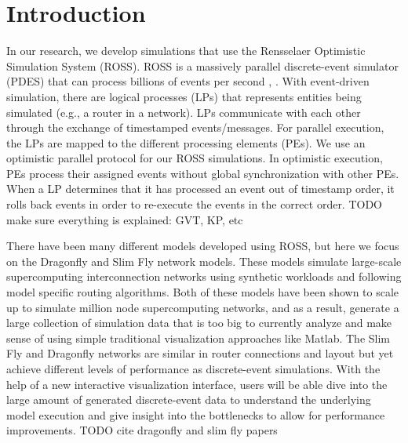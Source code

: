 \documentclass{acm_proc_article-sp}
\begin{document}
\maketitle
%
%

%
%


%
%

%
%






\section{Introduction}
In our research, we develop simulations that use the Rensselaer Optimistic Simulation System (ROSS).  ROSS is a massively parallel discrete-event simulator (PDES) that can process billions of events per second \cite{Holder}, \cite{Bauer}.  With event-driven simulation, there are logical processes (LPs) that represents entities being simulated (e.g., a router in a network). LPs communicate with each other through the exchange of timestamped events/messages.  For parallel execution, the LPs are mapped to the different processing elements (PEs). We use an optimistic parallel protocol for our ROSS simulations.  In optimistic execution, PEs process their assigned events without global synchronization with other PEs.  When a LP determines that it has processed an event out of timestamp order, it rolls back events in order to re-execute the events in the correct order.
\color{red} TODO make sure everything is explained: GVT, KP, etc \color{black}

There have been many different models developed using ROSS, but here we focus on the Dragonfly and Slim Fly network models. These models simulate large-scale supercomputing interconnection networks using synthetic workloads and following model specific routing algorithms. Both of these models have been shown to scale up to simulate million node supercomputing networks, and as a result, generate a large collection of simulation data that is too big to currently analyze and make sense of using simple traditional visualization approaches like Matlab. The Slim Fly and Dragonfly networks are similar in router connections and layout but yet achieve different levels of performance as discrete-event simulations. With the help of a new interactive visualization interface, users will be able dive into the large amount of generated discrete-event data to understand the underlying model execution and give insight into the bottlenecks to allow for performance improvements. 
\color{red} TODO cite dragonfly and slim fly papers \color{black}
\end{document}
